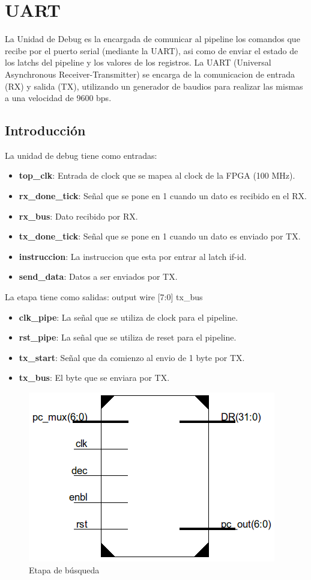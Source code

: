 \section{UART}
La Unidad de Debug es la encargada de comunicar al pipeline los comandos que recibe por el puerto serial (mediante la UART), asi como de enviar el estado de los latchs del pipeline y los valores de los registros. La UART (Universal Asynchronous Receiver-Transmitter) se encarga de la comunicacion de entrada (RX) y salida (TX), utilizando un generador de baudios para realizar las mismas a una velocidad de 9600 bps.

\subsection{Introducción}
La unidad de debug tiene como entradas:

\begin{itemize}
  \item \textbf{top\_clk}: Entrada de clock que se mapea al clock de la FPGA (100 MHz). 
  \item \textbf{rx\_done\_tick}: Señal que se pone en 1 cuando un dato es recibido en el RX.
  \item \textbf{rx\_bus}: Dato recibido por RX.
  \item \textbf{tx\_done\_tick}: Señal que se pone en 1 cuando un dato es enviado por TX.
  \item \textbf{instruccion}: La instruccion que esta por entrar al latch if-id.
  \item \textbf{send\_data}: Datos a ser enviados por TX.
\end{itemize} 

La etapa tiene como salidas:
	 output wire [7:0] tx\_bus
\begin{itemize}
	\item \textbf{clk\_pipe}: La señal que se utiliza de clock para el pipeline. 
	\item \textbf{rst\_pipe}: La señal que se utiliza de reset para el pipeline.
	\item \textbf{tx\_start}: Señal que da comienzo al envio de 1 byte por TX. 
	\item \textbf{tx\_bus}: El byte que se enviara por TX.
\end{itemize} 

\begin{figure}[H]
\centering
\includegraphics[scale=0.35]{Capitulo01/fetchstage}
\caption{Etapa de búsqueda}
\label{fig:fetch}
\end{figure}

